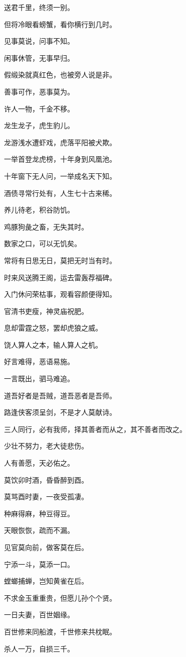 \documentclass[12pt,oneside]{book}
\begin{document}
送君千里，终须一别。

但将冷眼看螃蟹，看你横行到几时。

见事莫说，问事不知。

闲事休管，无事早归。

假缎染就真红色，也被旁人说是非。

善事可作，恶事莫为。

许人一物，千金不移。

龙生龙子，虎生豹儿。

龙游浅水遭虾戏，虎落平阳被犬欺。

一举首登龙虎榜，十年身到风凰池。

十年窗下无人问，一举成名天下知。

酒债寻常行处有，人生七十古来稀。

养儿待老，积谷防饥。

鸡豚狗彘之畜，无失其时。

数家之口，可以无饥矣。

常将有日思无日，莫把无时当有时。

时来风送腾王阁，运去雷轰荐福碑。

入门休问荣枯事，观看容颜便得知。

官清书吏瘦，神灵庙祝肥。

息却雷霆之怒，罢却虎狼之威。

饶人算人之本，输人算人之机。

好言难得，恶语易施。

一言既出，驷马难追。

道吾好者是吾贼，道吾恶者是吾师。

路逢侠客须呈剑，不是才人莫献诗。

三人同行，必有我师，择其善者而从之，其不善者而改之。

少壮不努力，老大徒悲伤。

人有善愿，天必佑之。

莫饮卯时酒，昏昏醉到酉。

莫骂酉时妻，一夜受孤凄。

种麻得麻，种豆得豆。

天眼恢恢，疏而不漏。

见官莫向前，做客莫在后。

宁添一斗，莫添一口。

螳螂捕蝉，岂知黄雀在后。

不求金玉重重贵，但愿儿孙个个贤。

一日夫妻，百世姻缘。

百世修来同船渡，千世修来共枕眠。

杀人一万，自损三千。
\end{document}
